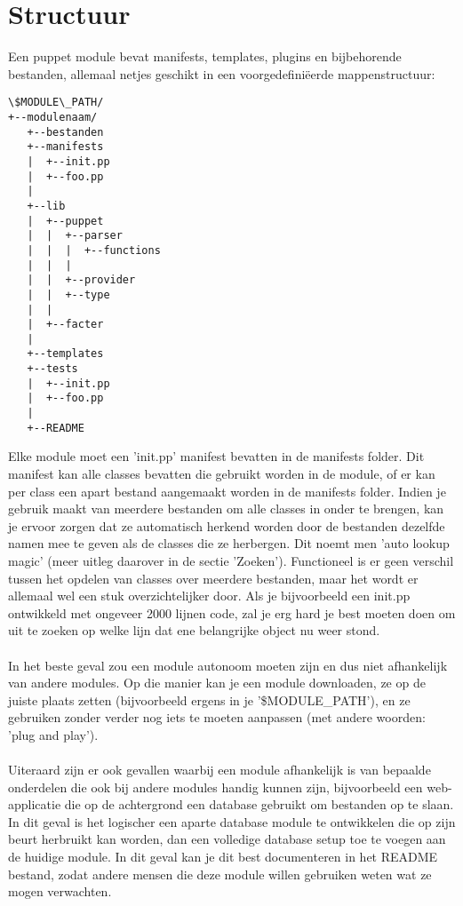\section{Structuur}
Een puppet module bevat manifests, templates, plugins en bijbehorende bestanden, allemaal netjes geschikt in een voorgedefini\"eerde mappenstructuur:
%
\begin{code}
\begin{lstlisting}
\$MODULE\_PATH/
+--modulenaam/
   +--bestanden
   +--manifests
   |  +--init.pp
   |  +--foo.pp
   |
   +--lib
   |  +--puppet
   |  |  +--parser
   |  |  |  +--functions
   |  |  |
   |  |  +--provider
   |  |  +--type
   |  |
   |  +--facter
   |
   +--templates
   +--tests
   |  +--init.pp
   |  +--foo.pp
   |
   +--README
\end{lstlisting}
\end{code}
%
Elke module moet een 'init.pp' manifest bevatten in de manifests folder. Dit manifest kan alle classes bevatten die gebruikt worden in de module, of er kan per class een apart bestand aangemaakt worden in de manifests folder. Indien je gebruik maakt van meerdere bestanden om alle classes in onder te brengen, kan je ervoor zorgen dat ze automatisch herkend worden door de bestanden dezelfde namen mee te geven als de classes die ze herbergen. Dit noemt men 'auto lookup magic' (meer uitleg daarover in de sectie 'Zoeken'). Functioneel is er geen verschil tussen het opdelen van classes over meerdere bestanden, maar het wordt er allemaal wel een stuk overzichtelijker door. Als je bijvoorbeeld een init.pp ontwikkeld met ongeveer 2000 lijnen code, zal je erg hard je best moeten doen om uit te zoeken op welke lijn dat ene belangrijke object nu weer stond.\\\\
%
In het beste geval zou een module autonoom moeten zijn en dus niet afhankelijk van andere modules. Op die manier kan je een module downloaden, ze op de juiste plaats zetten (bijvoorbeeld ergens in je '\$MODULE\_PATH'), en ze gebruiken zonder verder nog iets te moeten aanpassen (met andere woorden: 'plug and play').\\\\
%
Uiteraard zijn er ook gevallen waarbij een module afhankelijk is van bepaalde onderdelen die ook bij andere modules handig kunnen zijn, bijvoorbeeld een web-applicatie die op de achtergrond een database gebruikt om bestanden op te slaan. In dit geval is het logischer een aparte database module te ontwikkelen die op zijn beurt herbruikt kan worden, dan een volledige database setup toe te voegen aan de huidige module. In dit geval kan je dit best documenteren in het README bestand, zodat andere mensen die deze module willen gebruiken weten wat ze mogen verwachten.
%
